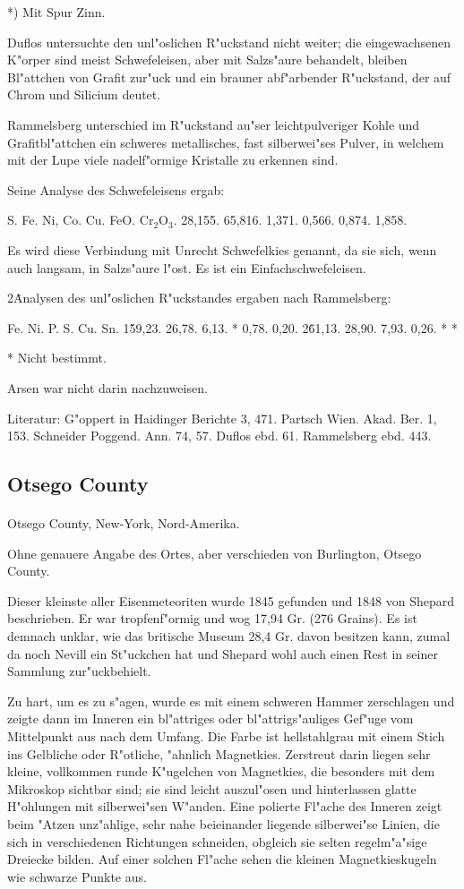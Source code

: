 \documentclass[a4paper, 11pt, oneside]{article}
\begin{document}
*) Mit Spur Zinn.

Duflos untersuchte den unl"oslichen R"uckstand nicht weiter; die eingewachsenen K"orper sind meist Schwefeleisen, aber mit Salzs"aure behandelt, bleiben Bl"attchen von Grafit zur"uck und ein brauner abf"arbender R"uckstand, der auf Chrom und Silicium deutet.

Rammelsberg unterschied im R"uckstand au"ser leichtpulveriger Kohle und Grafitbl"attchen ein schweres metallisches, fast silberwei"ses Pulver, in welchem mit der Lupe viele nadelf"ormige Kristalle zu erkennen sind.

Seine Analyse des Schwefeleisens ergab:

S. Fe. Ni, Co. Cu. FeO. Cr$_{2}$O$_{3}$.  
28,155. 65,816. 1,371. 0,566. 0,874. 1,858.

Es wird diese Verbindung mit Unrecht Schwefelkies genannt, da sie sich, wenn auch langsam, in Salzs"aure l"ost. Es ist ein Einfachschwefeleisen.

2\. Analysen des unl"oslichen R"uckstandes ergaben nach Rammelsberg:

Fe. Ni. P. S. Cu. Sn.  
1\. 59,23. 26,78. 6,13. * 0,78. 0,20.  
2\. 61,13. 28,90. 7,93. 0,26. * *

* Nicht bestimmt.

Arsen war nicht darin nachzuweisen.

Literatur: G"oppert in Haidinger Berichte 3, 471. Partsch Wien. Akad. Ber. 1, 153. Schneider Poggend. Ann. 74, 57. Duflos ebd. 61. Rammelsberg ebd. 443.

\subsection{Otsego County}
\normalsize
\paragraph{}
Otsego County, New-York, Nord-Amerika.

Ohne genauere Angabe des Ortes, aber verschieden von Burlington, Otsego County.

Dieser kleinste aller Eisenmeteoriten wurde 1845 gefunden und 1848 von Shepard beschrieben. Er war tropfenf"ormig und wog 17,94 Gr. (276 Grains). Es ist demnach unklar, wie das britische Museum 28,4 Gr. davon besitzen kann, zumal da noch Nevill ein St"uckchen hat und Shepard wohl auch einen Rest in seiner Sammlung zur"uckbehielt.

Zu hart, um es zu s"agen, wurde es mit einem schweren Hammer zerschlagen und zeigte dann im Inneren ein bl"attriges oder bl"attrigs"auliges Gef"uge vom Mittelpunkt aus nach dem Umfang. Die Farbe ist hellstahlgrau mit einem Stich ins Gelbliche oder R"otliche, "ahnlich Magnetkies. Zerstreut darin liegen sehr kleine, vollkommen runde K"ugelchen von Magnetkies, die besonders mit dem Mikroskop sichtbar sind; sie sind leicht auszul"osen und hinterlassen glatte H"ohlungen mit silberwei"sen W"anden. Eine polierte Fl"ache des Inneren zeigt beim "Atzen unz"ahlige, sehr nahe beieinander liegende silberwei"se Linien, die sich in verschiedenen Richtungen schneiden, obgleich sie selten regelm"a"sige Dreiecke bilden. Auf einer solchen Fl"ache sehen die kleinen Magnetkieskugeln wie schwarze Punkte aus.
\end{document}
